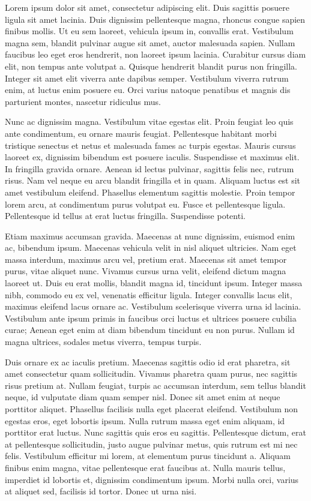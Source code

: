 \documentclass[
  a5paper,
  smalldemyvopaper,10pt,twoside,onecolumn,openright,extrafontsizes,hidelinks]{memoir}
\begin{document}
Lorem ipsum dolor sit amet, consectetur adipiscing elit. Duis sagittis
posuere ligula sit amet lacinia. Duis dignissim pellentesque magna,
rhoncus congue sapien finibus mollis. Ut eu sem laoreet, vehicula ipsum
in, convallis erat. Vestibulum magna sem, blandit pulvinar augue sit
amet, auctor malesuada sapien. Nullam faucibus leo eget eros hendrerit,
non laoreet ipsum lacinia. Curabitur cursus diam elit, non tempus ante
volutpat a. Quisque hendrerit blandit purus non fringilla. Integer sit
amet elit viverra ante dapibus semper. Vestibulum viverra rutrum enim,
at luctus enim posuere eu. Orci varius natoque penatibus et magnis dis
parturient montes, nascetur ridiculus mus.

Nunc ac dignissim magna. Vestibulum vitae egestas elit. Proin feugiat
leo quis ante condimentum, eu ornare mauris feugiat. Pellentesque
habitant morbi tristique senectus et netus et malesuada fames ac turpis
egestas. Mauris cursus laoreet ex, dignissim bibendum est posuere
iaculis. Suspendisse et maximus elit. In fringilla gravida ornare.
Aenean id lectus pulvinar, sagittis felis nec, rutrum risus. Nam vel
neque eu arcu blandit fringilla et in quam. Aliquam luctus est sit amet
vestibulum eleifend. Phasellus elementum sagittis molestie. Proin tempor
lorem arcu, at condimentum purus volutpat eu. Fusce et pellentesque
ligula. Pellentesque id tellus at erat luctus fringilla. Suspendisse
potenti.

Etiam maximus accumsan gravida. Maecenas at nunc dignissim, euismod enim
ac, bibendum ipsum. Maecenas vehicula velit in nisl aliquet ultricies.
Nam eget massa interdum, maximus arcu vel, pretium erat. Maecenas sit
amet tempor purus, vitae aliquet nunc. Vivamus cursus urna velit,
eleifend dictum magna laoreet ut. Duis eu erat mollis, blandit magna id,
tincidunt ipsum. Integer massa nibh, commodo eu ex vel, venenatis
efficitur ligula. Integer convallis lacus elit, maximus eleifend lacus
ornare ac. Vestibulum scelerisque viverra urna id lacinia. Vestibulum
ante ipsum primis in faucibus orci luctus et ultrices posuere cubilia
curae; Aenean eget enim at diam bibendum tincidunt eu non purus. Nullam
id magna ultrices, sodales metus viverra, tempus turpis.

Duis ornare ex ac iaculis pretium. Maecenas sagittis odio id erat
pharetra, sit amet consectetur quam sollicitudin. Vivamus pharetra quam
purus, nec sagittis risus pretium at. Nullam feugiat, turpis ac accumsan
interdum, sem tellus blandit neque, id vulputate diam quam semper nisl.
Donec sit amet enim at neque porttitor aliquet. Phasellus facilisis
nulla eget placerat eleifend. Vestibulum non egestas eros, eget lobortis
ipsum. Nulla rutrum massa eget enim aliquam, id porttitor erat luctus.
Nunc sagittis quis eros eu sagittis. Pellentesque dictum, erat at
pellentesque sollicitudin, justo augue pulvinar metus, quis rutrum est
mi nec felis. Vestibulum efficitur mi lorem, at elementum purus
tincidunt a. Aliquam finibus enim magna, vitae pellentesque erat
faucibus at. Nulla mauris tellus, imperdiet id lobortis et, dignissim
condimentum ipsum. Morbi nulla orci, varius at aliquet sed, facilisis id
tortor. Donec ut urna nisi.
\end{document}
